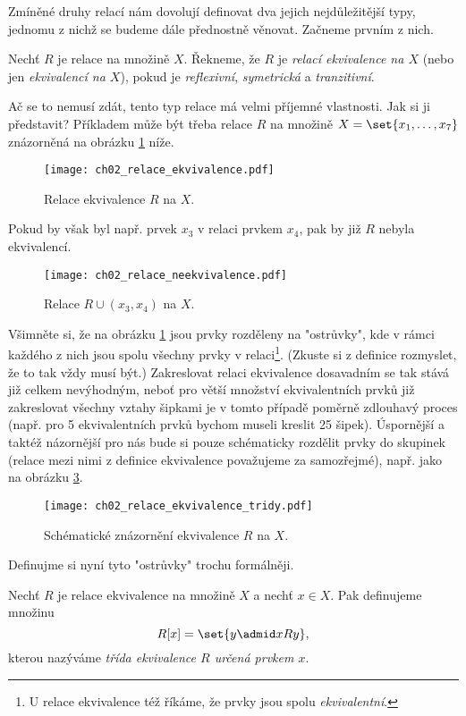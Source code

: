 Zmíněné druhy relací nám dovolují definovat dva jejich nejdůležitější typy, jednomu z nichž se budeme dále přednostně věnovat. Začneme prvním z nich.
\begin{definition}\label{def:relace_ekvivalence}
    Nechť $R$ je relace na množině $X$. Řekneme, že $R$ je \emph{relací ekvivalence na $X$} (nebo jen \emph{ekvivalencí na $X$}), pokud je \emph{reflexivní}, \emph{symetrická} a \emph{tranzitivní}.
\end{definition}
Ač se to nemusí zdát, tento typ relace má velmi příjemné vlastnosti. Jak si ji představit? Příkladem může být třeba relace $R$ na množině $X=\set{x_1,\ldots,x_7}$ znázorněná na obrázku \ref{fig:priklad_relace_ekvivalence} níže.
\begin{figure}[H]
    \centering
    \texttt{[image: ch02\_relace\_ekvivalence.pdf]}
    \caption{Relace ekvivalence $R$ na $X$.}
    \label{fig:priklad_relace_ekvivalence}
\end{figure}
Pokud by však byl např. prvek $x_3$ v relaci prvkem $x_4$, pak by již $R$ nebyla ekvivalencí.
\begin{figure}[H]
    \centering
    \texttt{[image: ch02\_relace\_neekvivalence.pdf]}
    \caption{Relace $R \cup (x_3,x_4)$ na $X$.}
    \label{fig:priklad_relace_neekvivalence}
\end{figure}
Všimněte si, že na obrázku \ref{fig:priklad_relace_ekvivalence} jsou prvky rozděleny na "ostrůvky", kde v rámci každého z nich jsou spolu všechny prvky v relaci\footnote{U relace ekvivalence též říkáme, že prvky jsou spolu \emph{ekvivalentní}.}. (Zkuste si z definice rozmyslet, že to tak vždy musí být.) Zakreslovat relaci ekvivalence dosavadním se tak stává již celkem nevýhodným, neboť pro větší množství ekvivalentních prvků již zakreslovat všechny vztahy šipkami je v tomto případě poměrně zdlouhavý proces (např. pro 5 ekvivalentních prvků bychom museli kreslit 25 šipek). Úspornější a taktéž názornější pro nás bude si pouze schématicky rozdělit prvky do skupinek (relace mezi nimi z definice ekvivalence považujeme za samozřejmé), např. jako na obrázku \ref{fig:relace_ekvivalence_tridy}.
\begin{figure}[H]
    \centering
    \texttt{[image: ch02\_relace\_ekvivalence\_tridy.pdf]}
    \caption{Schématické znázornění ekvivalence $R$ na $X$.}
    \label{fig:relace_ekvivalence_tridy}
\end{figure}
Definujme si nyní tyto "ostrůvky" trochu formálněji.
\begin{definition}
    Nechť $R$ je relace ekvivalence na množině $X$ a nechť $x\in X$. Pak definujeme množinu
    \begin{equation*}
        R[x]=\set{y \admid xRy},
    \end{equation*}
    kterou nazýváme \emph{třída ekvivalence $R$ určená prvkem $x$}.
\end{definition}
